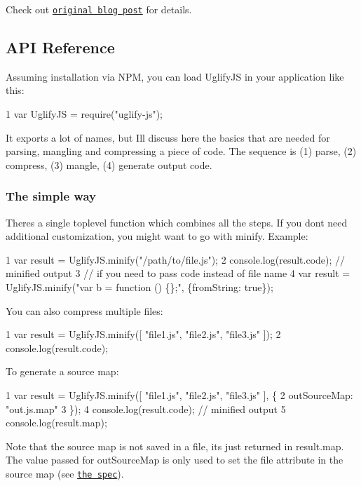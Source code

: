 Check out \href{http://rreverser.com/using-mozilla-ast-with-uglifyjs/}{\tt original blog post} for details.

\subsection*{A\+P\+I Reference }

Assuming installation via N\+P\+M, you can load Uglify\+J\+S in your application like this\+: 
\begin{DoxyCode}
1 var UglifyJS = require("uglify-js");
\end{DoxyCode}


It exports a lot of names, but I\textquotesingle{}ll discuss here the basics that are needed for parsing, mangling and compressing a piece of code. The sequence is (1) parse, (2) compress, (3) mangle, (4) generate output code.

\subsubsection*{The simple way}

There\textquotesingle{}s a single toplevel function which combines all the steps. If you don\textquotesingle{}t need additional customization, you might want to go with {\ttfamily minify}. Example\+: 
\begin{DoxyCode}
1 var result = UglifyJS.minify("/path/to/file.js");
2 console.log(result.code); // minified output
3 // if you need to pass code instead of file name
4 var result = UglifyJS.minify("var b = function () \{\};", \{fromString: true\});
\end{DoxyCode}


You can also compress multiple files\+: 
\begin{DoxyCode}
1 var result = UglifyJS.minify([ "file1.js", "file2.js", "file3.js" ]);
2 console.log(result.code);
\end{DoxyCode}


To generate a source map\+: 
\begin{DoxyCode}
1 var result = UglifyJS.minify([ "file1.js", "file2.js", "file3.js" ], \{
2     outSourceMap: "out.js.map"
3 \});
4 console.log(result.code); // minified output
5 console.log(result.map);
\end{DoxyCode}


Note that the source map is not saved in a file, it\textquotesingle{}s just returned in {\ttfamily result.\+map}. The value passed for {\ttfamily out\+Source\+Map} is only used to set the {\ttfamily file} attribute in the source map (see \href{https://docs.google.com/document/d/1U1RGAehQwRypUTovF1KRlpiOFze0b-_2gc6fAH0KY0k/edit}{\tt the spec}).

